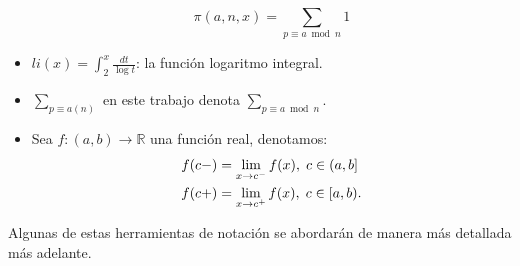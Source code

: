 \begin{itemize}[label=$\bullet$]
$$\pi(a,n,x)=\sum_{p\equiv a\bmod{n}}1$$

\item $li(x)=\displaystyle\int_2^x\frac{dt}{\log t}$: la función logaritmo integral.

\item $\displaystyle\sum_{p\equiv a (n)}$ en este trabajo denota $\displaystyle\sum_{p\equiv a \bmod{n}}$.

\item Sea $f:(a,b) \longrightarrow \mathbb{R}$ una función real, denotamos:
   \begin{align*}
       f(c-)&=\lim_{x \rightarrow c^-} f(x), \hspace{0.1cm} c \in (a,b] \notag \\
       f(c+)&=\lim_{x \rightarrow c^+} f(x), \hspace{0.1cm} c \in [a,b).
   \end{align*}
\end{itemize}

\begin{note}
Algunas de estas herramientas de notación se abordarán de manera más detallada más adelante.
\end{note}

\begin{comment}
En el capítulo 1 presentaremos algunos preliminares que se pueden consultar en el contenido y estudiaremos un poco la función $\zeta(s)$ y su derivada logarítmica $\dfrac{\zeta^{\prime}(s)}{\zeta(s)}$, veremos que el TNP es equivalente a la afirmación $\psi(x)\thicksim x$, función que también estudiaremos allí. El capítulo 2 será para presentar una prueba del teorema de Dirichlet, las ideas subyacentes y los preliminares de la  prueba también se desarrollarán allí, en los capítulos 3 y 4 se desarrollarán las pruebas del TNP y el TNP sobre progresiones aritmética, estudiaremos la teoría Tauberiana, que nos permitirá dar una prueba sencilla del TNP y donde casi toda  la variable compleja estará escondida en el teorema de Wiener-Ikehara que también presentaremos allí junto con algunas aplicaciones.
\end{comment}